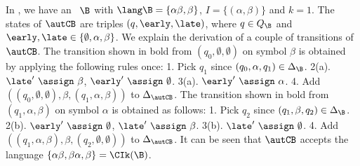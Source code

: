 \begin{example} 
In , we have an \nfa~$\B$ with $\lang \B =  \{\alpha\beta, \beta\}$, 
$I = \{(\alpha,\beta)\}$ and $k = 1$. The states of $\autCB$ are triples $(q, \early, \late)$, where 
$q \in Q_\B$ and $\early, \late \in \{\emptyset,\alpha,\beta\}$. 
We explain the derivation of a couple of transitions of $\autCB$. The transition shown in bold 
from $(q_0, \emptyset,\emptyset)$ on symbol $\beta$ is obtained by applying the following rules once: 
1. Pick $q_1$ since $(q_0, \alpha, q_1) \in \Delta_\B$. 2(a). $\late'\ \assign\ \beta$, $\early'\ \assign\ \emptyset$. 
3(a). $\early'\ \assign\ \alpha$. 4. Add $((q_0, \emptyset, \emptyset),\beta,(q_1, \alpha, \beta))$ to $\Delta_{\autCB}$. 
The transition shown in bold from $(q_1, \alpha,\beta)$ on symbol $\alpha$ 
is obtained as follows:
1. Pick $q_2$ since $(q_1, \beta, q_2) \in \Delta_\B$. 2(b). $\early'\ \assign\ \emptyset$, $\late'\ \assign\ \beta$.  
3(b). $\late'\ \assign\ \emptyset$. 4. Add $((q_1, \alpha, \beta),\beta,(q_2, \emptyset, \emptyset))$ to $\Delta_{\autCB}$.
It can be seen that $\autCB$ accepts the language $\{\alpha\beta,\beta\alpha,\beta\} = \CIk(\B)$.
\end{example}

